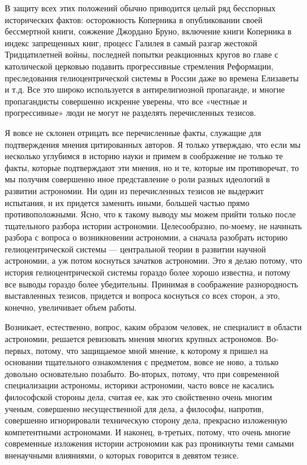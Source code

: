 В защиту всех этих положений обычно приводится целый ряд бесспорных
исторических фактов: осторожность Коперника в опубликовании своей
бессмертной книги, сожжение Джордано Бруно, включение книги Коперника
в индекс запрещенных книг, процесс Галилея в самый разгар жестокой
Тридцатилетней войны, последней попытки реакционных кругов во главе с
католической церковью подавить прогрессивные стремления Реформации,
преследования гелиоцентрической системы в России даже во времена
Елизаветы и т.д. Все это широко используется в антирелигиозной
пропаганде, и многие пропагандисты совершенно искренне уверены, что
все «честные и прогрессивные» люди не могут не разделять перечисленных
тезисов.

Я вовсе не склонен отрицать все перечисленные факты, служащие для
подтверждения мнения цитированных авторов. Я только утверждаю, что
если мы несколько углубимся в историю науки и примем в соображение не
только те факты, которые подтверждают эти мнения, но и те, которые им
противоречат, то мы получим совершенно иное представление о роли
разных идеологий в развитии астрономии. Ни один из перечисленных
тезисов не выдержит испытания, и их придется заменить иными, большей
частью прямо противоположными. Ясно, что к такому выводу мы можем
прийти только после тщательного разбора истории астрономии.
Целесообразно, по-моему, не начинать разбора с вопроса о возникновении
астрономии, а сначала разобрать историю гелиоцентрической системы ---
центральной теории в развитии научной астрономии, а уж потом коснуться
зачатков астрономии. Это я делаю потому, что история гелиоцентрической
системы гораздо более хорошо известна, и потому все выводы гораздо
более убедительны. Принимая в соображение разнородность выставленных
тезисов, придется и вопроса коснуться со всех сторон, а это, конечно,
увеличивает объем работы.

Возникает, естественно, вопрос, каким образом человек, не специалист в
области астрономии, решается ревизовать мнения многих крупных
астрономов. Во-первых, потому, что защищаемое мной мнение, к которому
я пришел на основании тщательного ознакомления с предметом, вовсе не
ново, а только довольно основательно позабыто. Во-вторых, потому, что
при современной специализации астрономы, историки астрономии, часто
вовсе не касались философской стороны дела, считая ее, как это
свойственно очень многим ученым, совершенно несущественной для дела, а
философы, напротив, совершенно игнорировали техническую сторону дела,
прекрасно изложенную компетентными астрономами. И наконец, в-третьих,
потому, что очень многие современные изложения истории астрономии как
раз проникнуты теми самыми вненаучными влияниями, о которых говорится
в девятом тезисе.


